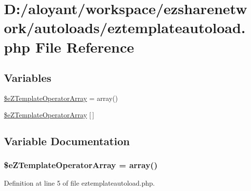 \hypertarget{eztemplateautoload_8php}{\section{D\-:/aloyant/workspace/ezsharenetwork/autoloads/eztemplateautoload.php File Reference}
\label{eztemplateautoload_8php}
}
\subsection*{Variables}
\begin{DoxyCompactItemize}
\item 
\hyperlink{eztemplateautoload_8php_a752948546e3085ce995ca4d3af879637}{\$e\-Z\-Template\-Operator\-Array} = array()
\item 
\hyperlink{eztemplateautoload_8php_a495af2bdf40c64a9e0c519ae1f0febd9}{\$e\-Z\-Template\-Operator\-Array} \mbox{[}$\,$\mbox{]}
\end{DoxyCompactItemize}


\subsection{Variable Documentation}
\hypertarget{eztemplateautoload_8php_a752948546e3085ce995ca4d3af879637}{
\subsubsection[{\$e\-Z\-Template\-Operator\-Array}]{\setlength{\rightskip}{0pt plus 5cm}\$e\-Z\-Template\-Operator\-Array = array()}}\label{eztemplateautoload_8php_a752948546e3085ce995ca4d3af879637}


Definition at line 5 of file eztemplateautoload.\-php.

